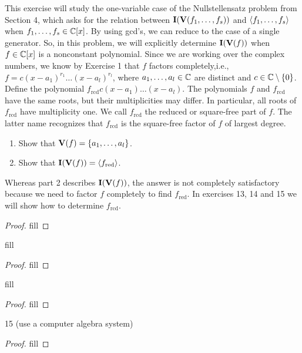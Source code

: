 \begin{exercise}{12}
This exercise will study the one-variable case of the Nullstellensatz problem from Section 4, which asks for the relation between $\mathbf{I}(\mathbf{V}(f_1,\dots,f_s))$ and $\langle f_1,\dots,f_s\rangle$ when $f_1,\dots,f_s\in\mathbb{C}[x]$. By using gcd's, we can reduce to the case of a single generator. So, in this problem, we will explicitly determine $\mathbf{I}(\mathbf{V}(f))$ when $f\in\mathbb{C}[x]$ is a nonconstant polynomial. Since we are working over the complex numbers, we know by Exercise 1 that $f$ factors completely,i.e., $f=c(x-a_1)^{r_1}\dots(x-a_l)^{r_l}$, where $a_1,\dots,a_l\in\mathbb{C}$ are distinct and $c\in\mathbb{C}\setminus\{0\}$. Define the polynomial $f_{\text{rcd}}c(x-a_1)\dots(x-a_l)$. The polynomials $f$ and $f_{\text{rcd}}$ have the same roots, but their multiplicities may differ. In particular, all roots of $f_{\text{rcd}}$ have multiplicity one. We call $f_{\text{rcd}}$ the reduced or square-free part of $f$. The latter name recognizes that $f_{\text{rcd}}$ is the square-free factor of $f$ of largest degree.
\begin{enumerate}
    \item Show that $\mathbf{V}(f)=\{a_1,\dots,a_l\}$.
    \item Show that $\mathbf{I}(\mathbf{V}(f))=\langle f_{\text{red}}\rangle$.
\end{enumerate}
Whereas part 2 describes $\mathbf{I}(\mathbf{V}(f))$, the answer is not completely satisfactory because we need to factor $f$ completely to find $f_{\text{red}}$. In exercises 13, 14 and 15 we will show how to determine $f_{\text{rcd}}$.
\end{exercise}
\begin{proof}
fill
\end{proof}

\begin{exercise}{13}
fill
\end{exercise}
\begin{proof}
fill
\end{proof}

\begin{exercise}{14}
fill
\end{exercise}
\begin{proof}
fill
\end{proof}

\begin{exercise}{15}
15 (use a computer algebra system)
\end{exercise}
\begin{proof}
fill
\end{proof}

